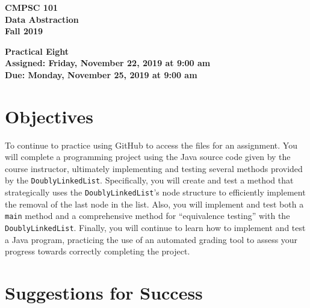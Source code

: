 \documentclass[11pt]{article}
\newcommand{\assignmentduedate}{November 25}
\newcommand{\assignmentassignedate}{November 22}
\newcommand{\assignmentnumber}{Eight}
\newcommand{\labyear}{2019}
\newcommand{\labday}{Friday}
\newcommand{\labdueday}{Monday}
\newcommand{\labtime}{9:00 am}
\newcommand{\assigneddate}{Assigned: \labday, \assignmentassignedate, \labyear{} at \labtime{}}
\newcommand{\duedate}{Due: \labdueday, \assignmentduedate, \labyear{} at \labtime{}}
\newcommand{\mainprogram}{\lstinline{DoublyLinkedList}}
\newcommand{\program}[1]{\lstinline{#1}}
\newcommand{\labtitle}[1]
{
  \begin{center}
    \begin{center}
      \bf
      CMPSC 101\\Data Abstraction\\
      Fall 2019\\
      \medskip
    \end{center}
    \bf
    #1
  \end{center}
}
\begin{document}
\thispagestyle{empty}

\labtitle{Practical \assignmentnumber{} \\ \assigneddate{} \\ \duedate{}}

\section*{Objectives}

To continue to practice using GitHub to access the files for an assignment. You
will complete a programming project using the Java source code given by the
course instructor, ultimately implementing and testing several methods provided
by the \mainprogram{}. Specifically, you will create and test a method that
strategically uses the \mainprogram's node structure to efficiently implement
the removal of the last node in the list. Also, you will implement and test both
a \program{main} method and a comprehensive method for ``equivalence testing''
with the \mainprogram{}. Finally, you will continue to learn how to implement
and test a Java program, practicing the use of an automated grading tool to
assess your progress towards correctly completing the project.

\section*{Suggestions for Success}
\end{document}
